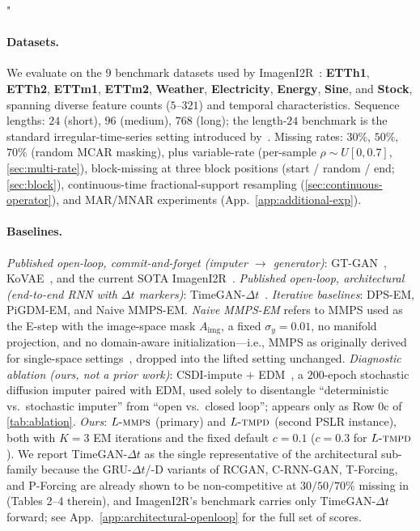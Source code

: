 "\documentclass{article}
\theoremstyle{plain}
\theoremstyle{definition}
\theoremstyle{remark}
\newcommand{\lmmps}{L\mbox{-}\textsc{mmps}}
\newcommand{\ltmpd}{L\mbox{-}\textsc{tmpd}}
\newcommand{\Aimg}{A_{\mathrm{img}}}
\begin{document}
\paragraph{Datasets.}
We evaluate on the $9$ benchmark datasets used by ImagenI2R~\citep{fadlon2025imageni2r}: \textbf{ETTh1}, \textbf{ETTh2}, \textbf{ETTm1}, \textbf{ETTm2}, \textbf{Weather}, \textbf{Electricity}, \textbf{Energy}, \textbf{Sine}, and \textbf{Stock}, spanning diverse feature counts ($5$--$321$) and temporal characteristics. Sequence lengths: $24$ (short), $96$ (medium), $768$ (long); the length-$24$ benchmark is the standard irregular-time-series setting introduced by~\citet{yoon2019timegan,jeon2022gtgan}. Missing rates: $30\%$, $50\%$, $70\%$ (random MCAR masking), plus variable-rate (per-sample $\rho \sim U[0, 0.7]$, \cref{sec:multi-rate}), block-missing at three block positions (start / random / end; \cref{sec:block}), continuous-time fractional-support resampling (\cref{sec:continuous-operator}), and MAR/MNAR experiments (App.~\ref{app:additional-exp}).

\paragraph{Baselines.}
\emph{Published open-loop, commit-and-forget (imputer $\to$ generator)}: GT-GAN~\citep{jeon2022gtgan}, KoVAE~\citep{naiman2024kovae}, and the current SOTA ImagenI2R~\citep{fadlon2025imageni2r}. \emph{Published open-loop, architectural (end-to-end RNN with $\Delta t$ markers)}: TimeGAN-$\Delta t$~\citep{yoon2019timegan,jeon2022gtgan,che2018recurrent}. \emph{Iterative baselines}: DPS-EM, PiGDM-EM, and Naive MMPS-EM. \emph{Naive MMPS-EM} refers to MMPS used as the E-step with the image-space mask $\Aimg$, a fixed $\sigma_y = 0.01$, no manifold projection, and no domain-aware initialization---i.e., MMPS as originally derived for single-space settings~\citep{rozet2024diem}, dropped into the lifted setting unchanged. \emph{Diagnostic ablation (ours, not a prior work)}: CSDI-impute $+$ EDM~\citep{tashiro2021csdi,karras2022edm}, a $200$-epoch stochastic diffusion imputer paired with EDM, used solely to disentangle ``deterministic vs.\ stochastic imputer'' from ``open vs.\ closed loop''; appears only as Row $0$c of \cref{tab:ablation}. \emph{Ours}: $\lmmps$ (primary) and $\ltmpd$ (second PSLR instance), both with $K{=}3$ EM iterations and the fixed default $c = 0.1$ ($c = 0.3$ for $\ltmpd$). We report TimeGAN-$\Delta t$ as the single representative of the architectural sub-family because the GRU-$\Delta t$/-D variants of RCGAN, C-RNN-GAN, T-Forcing, and P-Forcing are already shown to be non-competitive at $30/50/70\%$ missing in~\citet{jeon2022gtgan} (Tables 2--4 therein), and ImagenI2R's benchmark carries only TimeGAN-$\Delta t$ forward; see App.~\ref{app:architectural-openloop} for the full set of scores.
\end{document}

